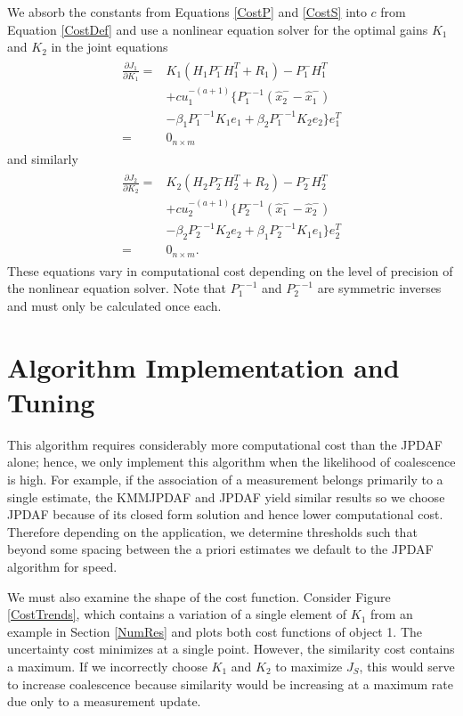 \documentclass[letterpaper, 10pt, conference]{ieeeconf}
\begin{document}
We absorb the constants from Equations \ref{CostP} and \ref{CostS} into $c$ from Equation \ref{CostDef} and use a nonlinear equation solver for the optimal gains $K_1$ and $K_2$ in the joint equations
\begin{align}
\label{Opt1}
\begin{split}
\frac{\partial J_{1}}{\partial K_{1}}=&K_1(H_1P_1^-H_1^T+R_1)-P_1^-H_1^T\\
&+cu_1^{-(a+1)}\{
{P_1^-}^{-1}(\hat x_2^--\hat x_1^-)\\
&-\beta_1{P_1^-}^{-1}K_1e_1
+\beta_2{P_1^-}^{-1}K_2e_2
\}e_1^T\\
=&0_{n\times m}
\end{split}
\end{align}
and similarly
\begin{align}
\label{Opt2}
\begin{split}
\frac{\partial J_{2}}{\partial K_{2}}=&K_2(H_2P_2^-H_2^T+R_2)-P_2^-H_2^T\\
&+cu_2^{-(a+1)}\{
{P_2^-}^{-1}(\hat x_1^--\hat x_2^-)\\
&-\beta_2{P_2^-}^{-1}K_2e_2
+\beta_1{P_2^-}^{-1}K_1e_1
\}e_2^T\\
=&0_{n\times m}.
\end{split}
\end{align}
These equations vary in computational cost depending on the level of precision of the nonlinear equation solver. Note that ${P_1^-}^{-1}$ and ${P_2^-}^{-1}$ are symmetric inverses and must only be calculated once each.


\section{Algorithm Implementation and Tuning}
\label{AlgImpTuning}
This algorithm requires considerably more computational cost than the JPDAF alone; hence, we only implement this algorithm when the likelihood of coalescence is high. For example, if the association of a measurement belongs primarily to a single estimate, the KMMJPDAF and JPDAF yield similar results so we choose JPDAF because of its closed form solution and hence lower computational cost. Therefore depending on the application, we determine thresholds such that beyond some spacing between the a priori estimates we default to the JPDAF algorithm for speed.

We must also examine the shape of the cost function. Consider Figure \ref{CostTrends}, which contains a variation of a single element of $K_1$ from an example in Section \ref{NumRes} and plots both cost functions of object 1. The uncertainty cost minimizes at a single point. However, the similarity cost contains a maximum. If we incorrectly choose $K_1$ and $K_2$ to maximize $J_S$, this would serve to increase coalescence because similarity would be increasing at a maximum rate due only to a measurement update.
\end{document}

